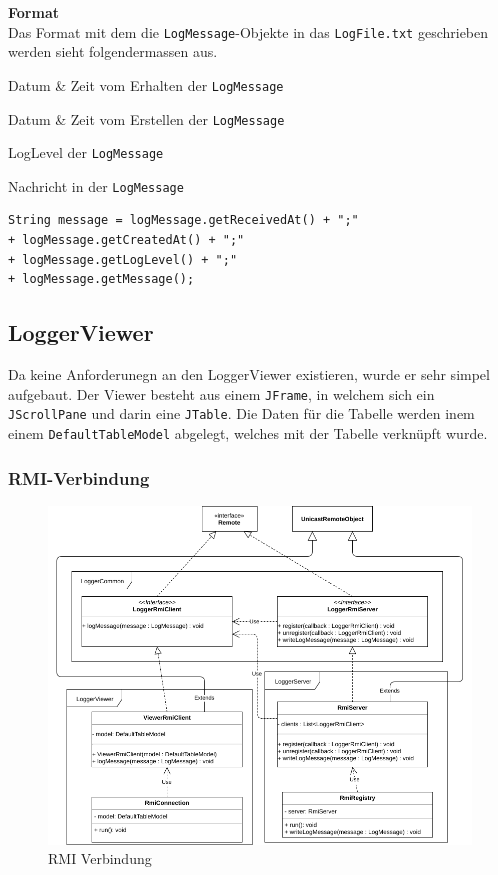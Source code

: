 \documentclass[12pt,a4paper,twosided]{scrartcl}
\newenvironment{tight_enumerate}{
\begin{enumerate}
	\setlength{\itemsep}{0pt}
	\setlength{\parskip}{0pt}
}{\end{enumerate}}
\begin{document}
\textbf{Format} \\
Das Format mit dem die \texttt{LogMessage}-Objekte in das \texttt{LogFile.txt} geschrieben werden sieht folgendermassen aus.

\begin{tight_enumerate}
	\item Datum \& Zeit vom Erhalten der \texttt{LogMessage}
	\item Datum \& Zeit vom Erstellen der \texttt{LogMessage}
	\item LogLevel der \texttt{LogMessage}
	\item Nachricht in der \texttt{LogMessage}
\end{tight_enumerate}

\begin{verbatim}
String message = logMessage.getReceivedAt() + ";"
+ logMessage.getCreatedAt() + ";"
+ logMessage.getLogLevel() + ";"
+ logMessage.getMessage();
\end{verbatim}

\subsection{LoggerViewer}
Da keine Anforderunegn an den LoggerViewer existieren, wurde er sehr simpel aufgebaut. Der Viewer besteht aus einem \texttt{JFrame}, in welchem sich ein  \texttt{JScrollPane} und darin eine  \texttt{JTable}. Die Daten für die Tabelle werden inem einem  \texttt{DefaultTableModel} abgelegt, welches mit der Tabelle verknüpft wurde.

\newpage

\subsubsection{RMI-Verbindung}
\begin{figure}[h]
	\centering
	\includegraphics[width=0.7\linewidth]{img/RMI-Connection}
	\caption{RMI Verbindung}
	\label{fig:rmi-connection}
\end{figure}
\end{document}
